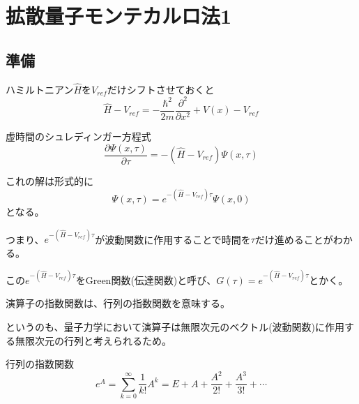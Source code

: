 \documentclass[dvipdfmx]{beamer}
\begin{document}
    \section{拡散量子モンテカルロ法1}
    \subsection{準備}
    \begin{frame}{\insertsubsection}
      ハミルトニアン$\hat{H}$を$V_{ref}$だけシフトさせておくと
      \begin{equation}
        \hat{H} - V_{ref} = -\dfrac{\hbar^2}{2m}\dfrac{\partial^2}{\partial x^2} + V(x) - V_{ref}
      \end{equation}
      \begin{block}{虚時間のシュレディンガー方程式}
          \begin{equation}
              \label{tmp7}
      \dfrac{\partial \Psi(x,\tau)}{\partial \tau} = -(\hat{H}-V_{ref})\Psi(x,\tau) \nonumber
          \end{equation}
      \end{block}

      これの解は形式的に
      \begin{equation}
        \Psi(x,\tau) = e^{-(\hat{H}-V_{ref})\tau}\Psi(x,0)
      \end{equation}
      となる。

      つまり、$e^{-(\hat{H}-V_{ref})\tau}$が波動関数に作用することで時間を$\tau$だけ進めることがわかる。

    \end{frame}

    \begin{frame}
        この$e^{-(\hat{H}-V_{ref})\tau}$をGreen関数(伝達関数)と呼び、$G(\tau) = e^{-(\hat{H}-V_{ref})\tau}$とかく。

        演算子の指数関数は、行列の指数関数を意味する。

        というのも、量子力学において演算子は無限次元のベクトル(波動関数)に作用する無限次元の行列と考えられるため。
        \begin{block}{行列の指数関数}
            \begin{equation}
                e^A = \sum_{k=0}^\infty \dfrac{1}{k!}A^k = E + A + \frac{A^2}{2!} + \frac{A^3}{3!} + \cdots
            \end{equation}
        \end{block}


      \end{frame}
\end{document}

